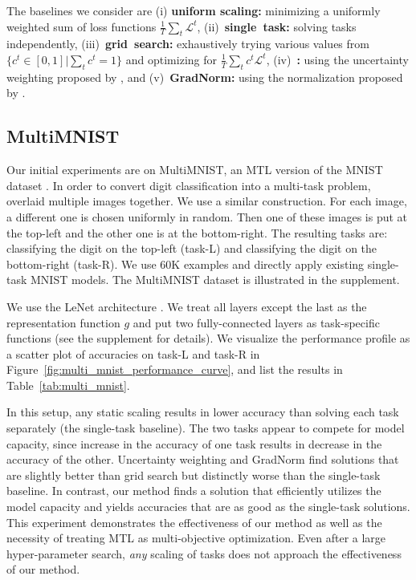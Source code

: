 \documentclass{article}
\def\lL{\mathcal{L}}
\begin{document}
The baselines we consider are (i) \textbf{uniform scaling:} minimizing a uniformly weighted sum of loss functions \mbox{$\frac{1}{T}\sum_t \lL^t$}, \mbox{(ii) \textbf{single task:}} solving tasks independently, \mbox{(iii) \textbf{grid search:}} exhaustively trying various values from $\{ c^t \in [0,1] | \sum_t c^t = 1\}$ and optimizing for $\frac{1}{T}\sum_t c^t \lL^t$, \mbox{(iv) \textbf{\citet{Kendall2018}:}} using the uncertainty weighting proposed by \citet{Kendall2018}, and \mbox{(v) \textbf{GradNorm:}} using the normalization proposed by \citet{Chen2018}.



\subsection{MultiMNIST}
\label{sec:multi_mnist_exp}

Our initial experiments are on MultiMNIST, an MTL version of the MNIST dataset \citep{multi_mnist}. In order to convert digit classification into a multi-task problem, \citet{multi_mnist} overlaid multiple images together. We use a similar construction. For each image, a different one is chosen uniformly in random. Then one of these images is put at the top-left and the other one is at the bottom-right. The resulting tasks are: classifying the digit on the top-left (task-L) and classifying the digit on the bottom-right (task-R). We use 60K examples and directly apply existing single-task MNIST models. The MultiMNIST dataset is illustrated in the supplement.

We use the LeNet architecture \citep{mnist}. We treat all layers except the last as the representation function $g$ and put two fully-connected layers as task-specific functions (see the supplement for details). We visualize the performance profile as a scatter plot of accuracies on task-L and task-R in Figure~\ref{fig:multi_mnist_performance_curve}, and list the results in Table~\ref{tab:multi_mnist}.

In this setup, any static scaling results in lower accuracy than solving each task separately (the single-task baseline). The two tasks appear to compete for model capacity, since increase in the accuracy of one task results in decrease in the accuracy of the other. Uncertainty weighting \citep{Kendall2018} and GradNorm \citep{Chen2018} find solutions that are slightly better than grid search but distinctly worse than the single-task baseline. In contrast, our method finds a solution that efficiently utilizes the model capacity and yields accuracies that are as good as the single-task solutions. This experiment demonstrates the effectiveness of our method as well as the necessity of treating MTL as multi-objective optimization. Even after a large hyper-parameter search, \emph{any} scaling of tasks does not approach the effectiveness of our method.
\end{document}
